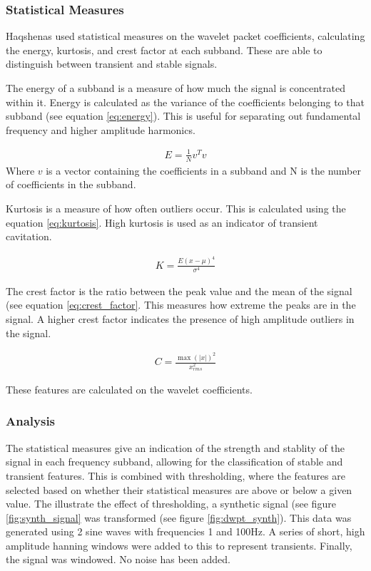 \documentclass[reprint,NumberedRefs]{JASA}
\begin{document}
\subsubsection{Statistical Measures}
Haqshenas \cite{Haqshenas_2015} used statistical measures on the wavelet packet coefficients, calculating the energy, kurtosis, and crest factor at each subband. These are able to distinguish between transient and stable signals.

The energy of a subband is a measure of how much the signal is concentrated within it. Energy is calculated as the variance of the coefficients belonging to that subband (see equation \ref{eq:energy}). This is useful for separating out fundamental frequency and higher amplitude harmonics.

\begin{align}
E = \frac{1}{N}v^Tv \label{eq:energy}
\end{align}
Where $v$ is a vector containing the coefficients in a subband and N is the number of coefficients in the subband.

Kurtosis is a measure of how often outliers occur. This is calculated using the equation \ref{eq:kurtosis}. High kurtosis is used as an indicator of transient cavitation.

\begin{align}
K = \frac{E(x-\mu)^4}{\sigma^4} \label{eq:kurtosis}
\end{align}

The crest factor is the ratio between the peak value and the mean of the signal (see equation \ref{eq:crest_factor}. This measures how extreme the peaks are in the signal. A higher crest factor indicates the presence of high amplitude outliers in the signal.

\begin{align}
C = \frac{{\max{(|x|)}}^2}{x_{rms}^2} \label{eq:crest_factor}
\end{align}

These features are calculated on the wavelet coefficients.

\subsubsection{Analysis}
The statistical measures give an indication of the strength and stablity of the signal in each frequency subband, allowing for the classification of stable and transient features. This is combined with thresholding, where the features are selected based on whether their statistical measures are above or below a given value. The illustrate the effect of thresholding, a synthetic signal (see figure \ref{fig:synth_signal} was transformed (see figure \ref{fig:dwpt_synth}). This data was generated using 2 sine waves with frequencies 1 and 100Hz. A series of short, high amplitude hanning windows were added to this to represent transients. Finally, the signal was windowed. No noise has been added.
\end{document}
